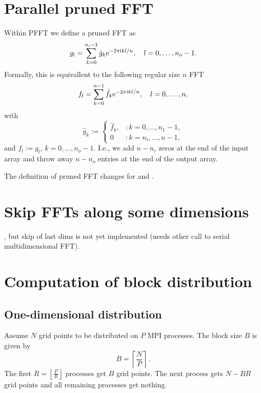 \section{Parallel pruned FFT}
Within PFFT we define a pruned FFT as
\begin{equation*}
  g_l = \sum_{k=0}^{n_i-1} \hat g_{k} \mathrm{e}^{-2\pi{\ensuremath{\text{\scriptsize{i}}}} kl/n}, \quad l=0,\hdots,n_o-1.
\end{equation*}
Formally, this is equivallent to the following regular size $n$ FFT
\begin{equation*}
  f_l = \sum_{k=0}^{n-1} \hat f_{k} \mathrm{e}^{-2\pi{\ensuremath{\text{\scriptsize{i}}}} kl/n}, \quad l=0,\hdots,n,
\end{equation*}
with 
\begin{equation*}
  \hat g_k := 
  \begin{cases}
  \hat f_k, &: k=0,\hdots,n_1-1, \\
  0         &: k=n_i,\hdots,n-1,    
  \end{cases}
\end{equation*}
and $f_l := g_l$, $k=0,\hdots,n_o-1$. I.e., we add $n-n_i$ zeros at the end of the input array and throw away $n-n_o$ entries at the end of the output array.


The definition of pruned FFT changes for  and .


\section{Skip FFTs along some dimensions}

, but skip of last  dims is not yet implemented (needs other call to serial multidimensional FFT). 





\section{Computation of block distribution}
\subsection{One-dimensional distribution}
Assume $N$ grid points to be distributed on $P$ MPI processes. The block size $B$ is given by
\begin{equation*}
  B = \left\lceil \frac{N}{P} \right\rceil\,.
\end{equation*}
The first $R=\left\lfloor\frac{P}{B}\right\rfloor$ processes get $B$ grid points. The next process gets $N-BR$ grid points and all remaining processes get nothing.


